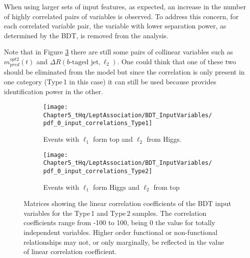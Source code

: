 When using larger sets of input features, as expected, an increase in the number 
of highly correlated pairs of variables is observed. To address this concern, for each 
correlated variable pair, the variable with lower separation power, as determined by 
the BDT, is removed from the analysis.

Note that in Figure \ref{fig:dileptau:Assignment_appendix:InputVars:Correlations} 
there are still some pairs of collinear variables such as $m^{opt2}_{pred}(t)$ and 
$\Delta R(b\text{-taged jet}, \ell_{2})$. One could think that one of these two should 
be eliminated from the model but since the correlation is only present in one 
category (Type$\,$1 in this case) it can still be used because provides identification
power in the other.

\begin{figure}
\centering
\begin{subfigure}[b]{0.75\textwidth}
   \texttt{[image: Chapter5\_tHq/LeptAssociation/BDT\_InputVariables/pdf\_0\_input\_correlations\_Type1]}
   \caption{Events with $\ell_{1}$ form top and $\ell_{2}$ from Higgs.}
   \label{fig:dileptau:Assignment_appendix:InputVars:Correlations:Type1} 
\end{subfigure}
\begin{subfigure}[b]{0.75\textwidth}
   \texttt{[image: Chapter5\_tHq/LeptAssociation/BDT\_InputVariables/pdf\_0\_input\_correlations\_Type2]}
   \caption{Events with $\ell_{1}$ form Higgs and $\ell_{2}$ from top}
   \label{fig:dileptau:Assignment_appendix:InputVars:Correlations:Type2}
\end{subfigure}
\caption{Matrices showing the linear correlation coefficients of the BDT input variables for the Type$\,$1 
and Type$\,$2 samples. The correlation coefficients range from -100 to 100, being 0 the value for 
totally independent variables. Higher order functional or non-functional
relationships may not, or only marginally, be reflected in the value of linear correlation coefficient.}
\label{fig:dileptau:Assignment_appendix:InputVars:Correlations} %
\end{figure}

